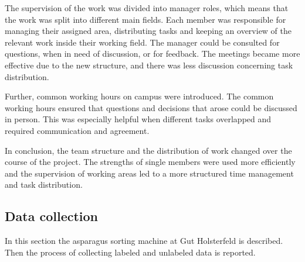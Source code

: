 The supervision of the work was divided into manager roles, which means that the work was split into different main fields. Each member was responsible for managing their assigned area, distributing tasks and keeping an overview of the relevant work inside their working field. The manager could be consulted for questions, when in need of discussion, or for feedback. The meetings became more effective due to the new structure, and there was less discussion concerning task distribution. 

Further, common working hours on campus were introduced. The common working hours ensured that questions and decisions that arose could be discussed in person. This was especially helpful when different tasks overlapped and required communication and agreement.

\bigskip
In conclusion, the team structure and the distribution of work changed over the course of the project. The strengths of single members were used more efficiently and the supervision of working areas led to a more structured time management and task distribution. 


\subsection{Data collection}
\label{sec:DataCollection}

In this section the asparagus sorting machine at Gut Holsterfeld is described. Then the process of collecting labeled and unlabeled data is reported.

